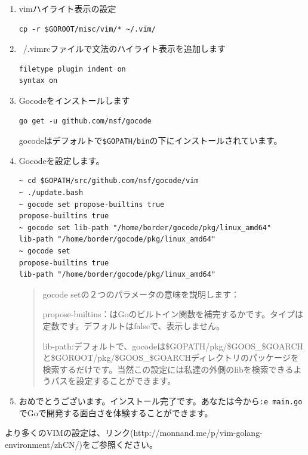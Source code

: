 \begin{enumerate}
\item vimハイライト表示の設定
  \begin{lstlisting}[numbers=none]
cp -r $GOROOT/misc/vim/* ~/.vim/
  \end{lstlisting}
\item ~/.vimrcファイルで文法のハイライト表示を追加します
  \begin{lstlisting}[numbers=none]
filetype plugin indent on
syntax on
  \end{lstlisting}
\item Gocodeをインストールします
  \begin{lstlisting}[numbers=none]
go get -u github.com/nsf/gocode
  \end{lstlisting}
  gocodeはデフォルトで\texttt{\$GOPATH\//bin}の下にインストールされています。
\item Gocodeを設定します。
  \begin{lstlisting}[numbers=none]
~ cd $GOPATH/src/github.com/nsf/gocode/vim
~ ./update.bash
~ gocode set propose-builtins true
propose-builtins true
~ gocode set lib-path "/home/border/gocode/pkg/linux_amd64"
lib-path "/home/border/gocode/pkg/linux_amd64"
~ gocode set
propose-builtins true
lib-path "/home/border/gocode/pkg/linux_amd64"
  \end{lstlisting}
  \begin{quote}
    gocode setの２つのパラメータの意味を説明します：

    propose-builtins：はGoのビルトイン関数を補完するかです。タイプは定数です。デフォルトはfalseで、表示しません。

    lib-path:デフォルトで、gocodeは\$GOPATH\//pkg\//\$GOOS\_\$GOARCHと\$GOROOT\//pkg\//\$GOOS\_\$GOARCHディレクトリのパッケージを検索するだけです。当然この設定には私達の外側のlibを検索できるようパスを設定することができます。
  \end{quote}
\item おめでとうございます。インストール完了です。あなたは今から\texttt{:e main.go}でGoで開発する面白さを体験することができます。
\end{enumerate}


より多くのVIMの設定は、リンク(http:\//\//monnand.me\//p\//vim-golang-environment\//zhCN\//)をご参照ください。
